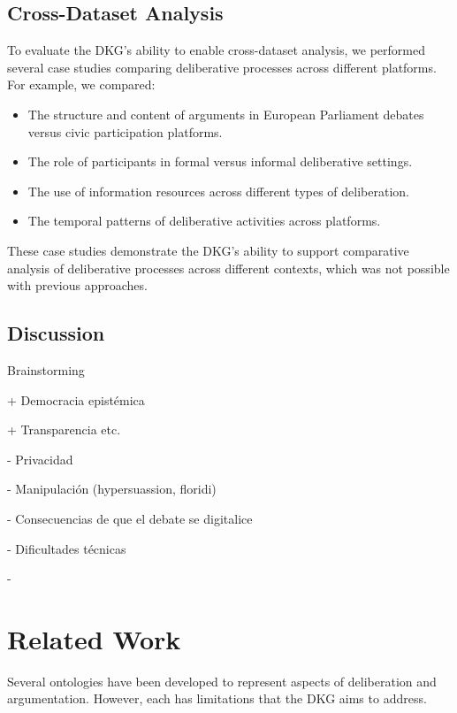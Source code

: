 \documentclass[runningheads]{llncs}  %
\begin{document}
\subsection{Cross-Dataset Analysis}
To evaluate the DKG's ability to enable cross-dataset analysis, we performed several case studies comparing deliberative processes across different platforms. For example, we compared:

\begin{itemize}
    \item The structure and content of arguments in European Parliament debates versus civic participation platforms.
    \item The role of participants in formal versus informal deliberative settings.
    \item The use of information resources across different types of deliberation.
    \item The temporal patterns of deliberative activities across platforms.
\end{itemize}

These case studies demonstrate the DKG's ability to support comparative analysis of deliberative processes across different contexts, which was not possible with previous approaches.

\subsection{Discussion} 
Brainstorming

+ Democracia epistémica

+ Transparencia etc.

- Privacidad

- Manipulación (hypersuassion, floridi)

- Consecuencias de que el debate se digitalice

- Dificultades técnicas

-
\section{Related Work}
Several ontologies have been developed to represent aspects of deliberation and argumentation. However, each has limitations that the DKG aims to address.
\end{document}
